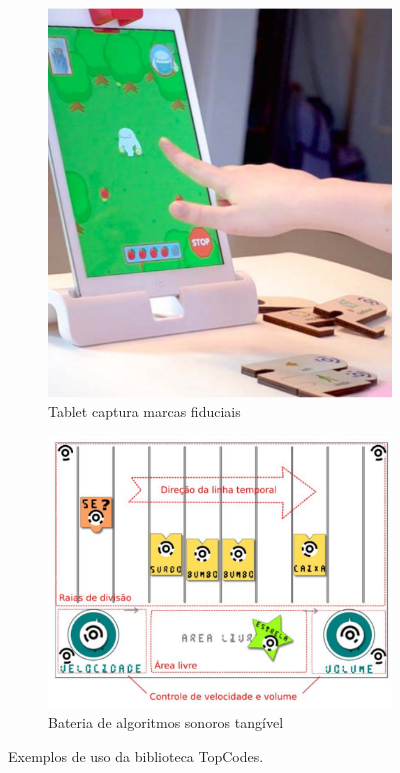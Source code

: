 \begin{figure}[h!]
    \centering
    \begin{subfigure}{.4\textwidth}
        \centering
        \includegraphics[width=.9\linewidth,fbox]{figs/topcodes_osmo.png}
        \caption{Tablet captura marcas fiduciais}
        \label{strawbies_topcodes}
    \end{subfigure}%
    \begin{subfigure}{.57\textwidth}
        \centering
        \includegraphics[width=.9\linewidth,fbox]{figs/topcodes_cassiano.png}
        \caption{Bateria de algoritmos sonoros tangível}
        \label{bateria_topcodes}
    \end{subfigure}
    \caption{Exemplos de uso da biblioteca TopCodes.}
    \label{topcodes_examples}
\end{figure}

